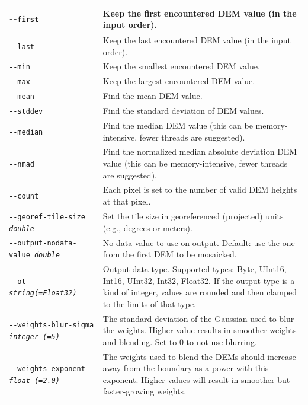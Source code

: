 \begin{longtable}{|l|p{10cm}|}
\texttt{-\/-first}
& Keep the first encountered DEM value (in the input order).
\\ \hline

\texttt{-\/-last}
& Keep the last encountered DEM value (in the input order).
\\ \hline

\texttt{-\/-min}
& Keep the smallest encountered DEM value.
\\ \hline

\texttt{-\/-max}
& Keep the largest encountered DEM value.
\\ \hline

\texttt{-\/-mean}
& Find the mean DEM value.
\\ \hline

\texttt{-\/-stddev}
& Find the standard deviation of DEM values.
\\ \hline

\texttt{-\/-median}
& Find the median DEM value (this can be memory-intensive, fewer threads are suggested).
\\ \hline

\texttt{-\/-nmad}
& Find the normalized median absolute deviation DEM value (this can be memory-intensive, fewer threads are suggested).
\\ \hline

\texttt{-\/-count}
& Each pixel is set to the number of valid DEM heights at that pixel.
\\ \hline

\texttt{-\/-georef-tile-size \textit{double}} &
Set the tile size in georeferenced (projected) units (e.g., degrees or meters).
\\ \hline
\texttt{-\/-output-nodata-value \textit{double}} &
No-data value to use on output. Default: use the one from the first DEM to be mosaicked.
\\ \hline

\texttt{-\/-ot \textit{string(=Float32)}} & Output data type. Supported types: Byte, UInt16, Int16, UInt32, Int32, Float32. If the output type is a kind of integer, values are rounded and then clamped to the limits of that type. \\ \hline

\texttt{-\/-weights-blur-sigma \textit{integer (=5)} } &
The standard deviation of the Gaussian used to blur the weights. Higher value results in smoother weights and blending. Set to 0 to not use blurring.
\\ \hline

\texttt{-\/-weights-exponent \textit{float (=2.0)} } &
The weights used to blend the DEMs should increase away from the boundary as a power with this exponent. Higher values will result in smoother but faster-growing weights.
\\ \hline


\end{longtable}
